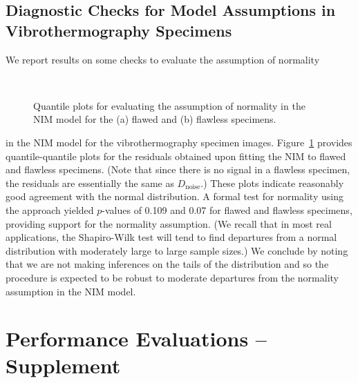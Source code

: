 \documentclass[12pt]{article}
\begin{document}
\subsection{Diagnostic Checks for Model Assumptions in
  Vibrothermography Specimens}
\label{supp.diag}
We report results on some checks to evaluate the assumption of normality
\begin{figure}[h]
\begin{center}
\mbox{
  }
\end{center}
\vspace{-0.2in}
\caption{Quantile plots for evaluating the assumption of normality in the NIM
  model for the (a) flawed  and (b) flawless specimens.}
\label{diags}
\vspace{-0.1in}
\end{figure}
in the NIM model for the vibrothermography specimen images. Figure~\ref{diags} provides quantile-quantile plots
for the residuals obtained upon fitting the NIM to  flawed and
flawless specimens. (Note that since there is no signal
in a flawless specimen, the residuals are essentially the same as
$D_{\mbox{noise}}$.) These plots indicate reasonably good agreement  
with the normal distribution. A formal test for normality using the
\citet{shapiroandwilk65} approach yielded $p$-values of 0.109  and
0.07 for flawed and flawless specimens, providing support for the
normality assumption. (We recall that in most real applications, the
Shapiro-Wilk test  will tend to find departures from a normal
distribution with moderately large to large sample sizes.) We conclude
by noting that we are not making inferences on the tails of the
distribution and so the procedure is expected to be robust to moderate
departures from the  normality assumption in the NIM model.

\section{Performance Evaluations -- Supplement}
\end{document}
